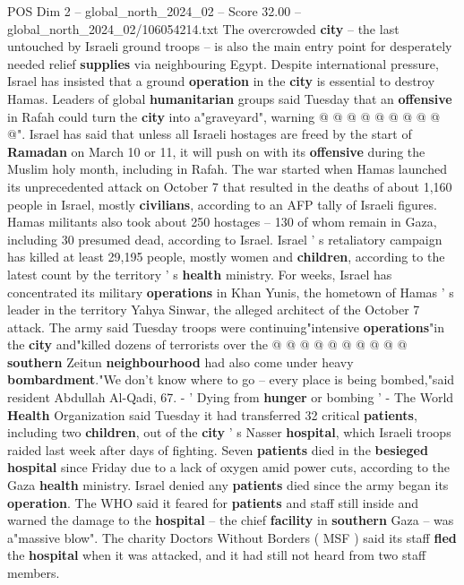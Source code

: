 \begin{textsample}{POS Dim 2 – global\_north\_2024\_02 – Score 32.00 – global\_north\_2024\_02/106054214.txt}
The overcrowded \textbf{city} -- the last untouched by Israeli ground troops -- is also the main entry point for desperately needed relief \textbf{supplies} via neighbouring Egypt.
Despite international pressure, Israel has insisted that a ground \textbf{operation} in the \textbf{city} is essential to destroy Hamas.
Leaders of global \textbf{humanitarian} groups said Tuesday that an \textbf{offensive} in Rafah could turn the \textbf{city} into a"graveyard", warning @ @ @ @ @ @ @ @ @ @".
Israel has said that unless all Israeli hostages are freed by the start of \textbf{Ramadan} on March 10 or 11, it will push on with its \textbf{offensive} during the Muslim holy month, including in Rafah.
The war started when Hamas launched its unprecedented attack on October 7 that resulted in the deaths of about 1,160 people in Israel, mostly \textbf{civilians}, according to an AFP tally of Israeli figures.
Hamas militants also took about 250 hostages -- 130 of whom remain in Gaza, including 30 presumed dead, according to Israel.
Israel ' s retaliatory campaign has killed at least 29,195 people, mostly women and \textbf{children}, according to the latest count by the territory ' s \textbf{health} ministry.
For weeks, Israel has concentrated its military \textbf{operations} in Khan Yunis, the hometown of Hamas ' s leader in the territory Yahya Sinwar, the alleged architect of the October 7 attack.
The army said Tuesday troops were continuing"intensive \textbf{operations}"in the \textbf{city} and"killed dozens of terrorists over the @ @ @ @ @ @ @ @ @ @ \textbf{southern} Zeitun \textbf{neighbourhood} had also come under heavy \textbf{bombardment}."We don't know where to go -- every place is being bombed,"said resident Abdullah Al-Qadi, 67. - ' Dying from \textbf{hunger} or bombing ' - The World \textbf{Health} Organization said Tuesday it had transferred 32 critical \textbf{patients}, including two \textbf{children}, out of the \textbf{city} ' s Nasser \textbf{hospital}, which Israeli troops raided last week after days of fighting.
Seven \textbf{patients} died in the \textbf{besieged} \textbf{hospital} since Friday due to a lack of oxygen amid power cuts, according to the Gaza \textbf{health} ministry.
Israel denied any \textbf{patients} died since the army began its \textbf{operation}.
The WHO said it feared for \textbf{patients} and staff still inside and warned the damage to the \textbf{hospital} -- the chief \textbf{facility} in \textbf{southern} Gaza -- was a"massive blow".
The charity Doctors Without Borders ( MSF ) said its staff \textbf{fled} the \textbf{hospital} when it was attacked, and it had still not heard from two staff members.

\end{textsample}
